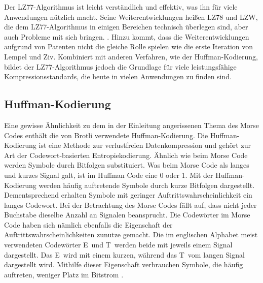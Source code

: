 Der LZ77-Algorithmus ist leicht verständlich und effektiv, was ihn für viele Anwendungen nützlich macht.
Seine Weiterentwicklungen heißen LZ78 und LZW, die dem LZ77-Algorithmus in einigen Bereichen technisch überlegen sind, aber auch Probleme mit sich bringen. \cite{Choudhary2015}.
Hinzu kommt, dass die Weiterentwicklungen aufgrund von Patenten nicht die gleiche Rolle spielen wie die erste Iteration von Lempel und Ziv.
Kombiniert mit anderen Verfahren, wie der Huffman-Kodierung, bildet der LZ77-Algorithmus jedoch die Grundlage für viele leistungsfähige Kompressionsstandards, die heute in vielen Anwendungen zu finden sind. \newline

\subsection{Huffman-Kodierung}
\label{subsec:huffman}
Eine gewisse Ähnlichkeit zu dem in der Einleitung angerissenen Thema des Morse Codes enthält die von Brotli verwendete Huffman-Kodierung.
Die Huffman-Kodierung ist eine Methode zur verlustfreien Datenkompression und gehört zur Art der Codewort-basierten Entropiekodierung.
Ähnlich wie beim Morse Code werden Symbole durch Bitfolgen substituiert.
Was beim Morse Code als langes und kurzes Signal galt, ist im Huffman Code eine 0 oder 1.
Mit der Huffman-Kodierung werden häufig auftretende Symbole durch kurze Bitfolgen dargestellt.
Dementsprechend erhalten Symbole mit geringer Auftrittswahrscheinlichkeit ein langes Codewort.
Bei der Betrachtung des Morse Codes fällt auf, dass nicht jeder Buchstabe dieselbe Anzahl an Signalen beansprucht.
Die Codewörter im Morse Code haben sich nämlich ebenfalls die Eigenschaft der Auftrittswahrscheinlichkeiten zunutze gemacht.
Die im englischen Alphabet meist verwendeten Codewörter \glqq E\grqq\ und \glqq T\grqq\ werden beide mit jeweils einem Signal dargestellt.
Das \glqq E\grqq\ wird mit einem kurzen, während das \glqq T\grqq\ vom langen Signal dargestellt wird.
Mithilfe dieser Eigenschaft verbrauchen Symbole, die häufig auftreten, weniger Platz im Bitstrom \cite{Moffat2019}.


